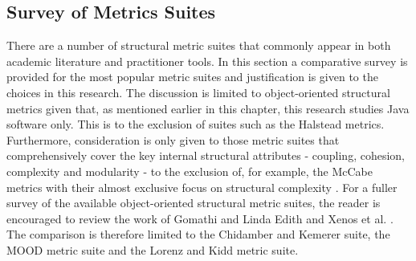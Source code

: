 \subsection{Survey of Metrics Suites}
There are a number of structural metric suites that commonly appear in both academic literature and practitioner tools. In this section a comparative survey is provided for the most popular metric suites and justification is given to the choices in this research. The discussion is limited to object-oriented structural metrics given that, as mentioned earlier in this chapter, this research studies Java software only. This is to the exclusion of suites such as the Halstead metrics. Furthermore, consideration is only given to those metric suites that comprehensively cover the key internal structural attributes - coupling, cohesion, complexity and modularity - to the exclusion of, for example, the McCabe metrics with their almost exclusive focus on structural complexity \citep{mccabe1976complexity, mccabe1989design}. For a fuller survey of the available object-oriented structural metric suites, the reader is encouraged to review the work of Gomathi and Linda Edith \citep{gomathi2013an} and Xenos et al. \citep{xenos2000object}. The comparison is therefore limited to the Chidamber and Kemerer suite, the MOOD metric suite and the Lorenz and Kidd metric suite.

